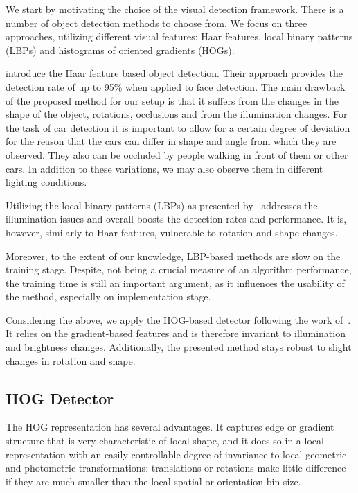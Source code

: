 We start by motivating the choice of the visual detection framework. There is
a number of object detection methods to choose from. We focus on three
approaches, utilizing different visual features: Haar features, local binary
patterns (LBPs) and histograms of oriented gradients (HOGs).

\citet{violajones2001} introduce the Haar feature based object detection.
Their approach provides the detection rate of up to 95\% when applied to face
detection. The main drawback of the proposed method for our setup is that it
suffers from the changes in the shape of the object, rotations, occlusions and
from the illumination changes. For the task of car detection it is important
to allow for a certain degree of deviation for the reason that the cars can
differ in shape and angle from which they are observed. They also can be
occluded by people walking in front of them or other cars. In addition to
these variations, we may also observe them in different lighting conditions.

Utilizing the local binary patterns (LBPs) as presented by~\citet{lbp2010}
addresses the illumination issues and overall boosts the detection rates and
performance. It is, however, similarly to Haar features, vulnerable to
rotation and shape changes.

Moreover, to the extent of our knowledge, LBP-based methods are slow on the
training stage. Despite, not being a crucial measure of an algorithm
performance, the training time is still an important argument, as it
influences the usability of the method, especially on implementation stage.

Considering the above, we apply the HOG-based detector following the work
of~\citet{dalal2005}. It relies on the gradient-based features and is
therefore invariant to illumination and brightness changes. Additionally, the
presented method stays robust to slight changes in rotation and shape.

\subsection{HOG Detector}\label{sub:hog_detector}

The HOG representation has several advantages. It captures edge or
gradient structure that is very characteristic of local shape, and it does
so in a local representation with an easily controllable degree of
invariance to local geometric and photometric transformations:
translations or rotations make little difference if they are much smaller
than the local spatial or orientation bin size.

